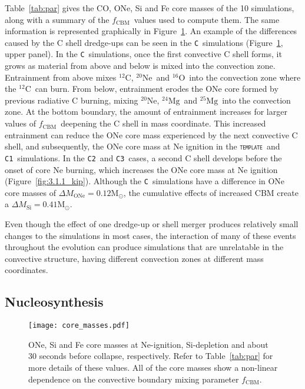 \documentclass[useAMS,usenatbib]{mn2e}
\newcommand{\fcbm}{\ensuremath{f_\mathrm{CBM}}}
\newcommand{\template}{\textsc{\texttt{template}}}
\newcommand{\Ca}{\textsc{\texttt{C1}}}
\newcommand{\Cb}{\textsc{\texttt{C2}}}
\newcommand{\Cc}{\textsc{\texttt{C3}}}
\newcommand{\C}{\textsc{\texttt{C}}}
\newcommand{\nuclei}[2]{\ensuremath{\mathrm{^{#1}#2}}}
\newcommand{\carbon}[1][12]{\nuclei{#1}{C}}
\newcommand{\oxygen}[1][16]{\nuclei{#1}{O}}
\newcommand{\neon}[1][20]{\nuclei{#1}{Ne}}
\newcommand{\magnesium}[1][24]{\nuclei{#1}{Mg}}
\newcommand{\magnesiumB}[1][25]{\nuclei{#1}{Mg}}
\begin{document}
Table~\ref{tab:par} gives the CO, ONe, Si and Fe core masses of the 10 simulations, along with a summary of the \fcbm\ values used to compute them. The same information is represented graphically in Figure~\ref{fig: core-masses}. An example of the differences caused by the C shell dredge-ups can be seen in the \C\ simulations (Figure~\ref{fig: core-masses},  upper panel). In the \C\ simulations, once the first convective C shell forms, it grows as material from above and below is mixed into the convection zone. Entrainment from above mixes \carbon, \neon\ and \oxygen\ into the convection zone where the \carbon\ can burn. From below, entrainment erodes the ONe core formed by previous radiative C burning, mixing \neon, \magnesium\ and \magnesiumB\ into the convection zone. At the bottom boundary, the amount of entrainment increases for larger values of \fcbm\ deepening the C shell in mass coordinate. This increased entrainment can reduce the ONe core mass experienced by the next convective C shell, and subsequently, the ONe core mass at Ne ignition in the \template\ and \Ca\ simulations. In the \Cb\ and \Cc\ cases, a second C shell develops before the onset of core Ne burning, which increases the ONe core mass at Ne ignition (Figure~\ref{fig:3.1.1_kip}). Although the \C\ simulations have a difference in ONe core masses of $\Delta M_{\mathrm{ONe}} = 0.12 \mathrm{M}_{\odot}$, the cumulative effects of increased CBM create a $\Delta M_{\mathrm{Si}} = 0.41 \mathrm{M}_{\odot}$.

Even though the effect of one dredge-up or shell merger produces relatively small changes to the simulations in most cases, the interaction of many of these events throughout the evolution can produce simulations that are unrelatable in the convective structure, having different convection zones at different mass coordinates.


\subsection{Nucleosynthesis} \label{sec: profac}

\begin{figure}
	\texttt{[image: core\_masses.pdf]}
	\caption{
		ONe, Si and Fe core masses at Ne-ignition, Si-depletion and
		about 30 seconds before collapse, respectively. Refer to 
		Table~\ref{tab:par} for more details of these values. All of the
		core masses show a non-linear dependence on the
		convective boundary mixing parameter \fcbm.
	}
	\label{fig: core-masses} %
\end{figure}
\end{document}
